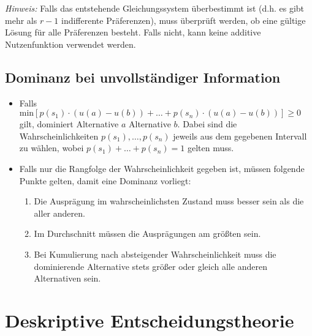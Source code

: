 \documentclass[12pt,a4paper]{scrartcl}
\begin{document}
\textit{Hinweis:} Falls das entstehende Gleichungssystem überbestimmt ist (d.h. es gibt mehr als $ r-1 $ indifferente Präferenzen), muss überprüft werden, ob eine gültige Lösung für alle Präferenzen besteht. Falls nicht, kann keine additive Nutzenfunktion verwendet werden.

\subsection{Dominanz bei unvollständiger Information}
\begin{itemize}
	\item Falls $ \text{min} \left[p(s_1) \cdot (u(a) - u(b)) + \dots + p(s_n) \cdot (u(a) - u(b)) \right] \geq 0$ gilt, dominiert Alternative $ a $ Alternative $ b $. Dabei sind die Wahrscheinlichkeiten $ p(s_1), \dots, p(s_n) $ jeweils aus dem gegebenen Intervall zu wählen, wobei $ p(s_1) + \dots + p(s_n) = 1 $ gelten muss.
	\item Falls nur die Rangfolge der Wahrscheinlichkeit gegeben ist, müssen folgende Punkte gelten, damit eine Dominanz vorliegt:
	\begin{enumerate}
		\item Die Ausprägung im wahrscheinlichsten Zustand muss besser sein als die aller anderen.
		\item Im Durchschnitt müssen die Ausprägungen am größten sein.
		\item Bei Kumulierung nach absteigender Wahrscheinlichkeit muss die dominierende Alternative stets größer oder gleich alle anderen Alternativen sein.
	\end{enumerate}
\end{itemize}

\newpage
\section{Deskriptive Entscheidungstheorie}
\end{document}

